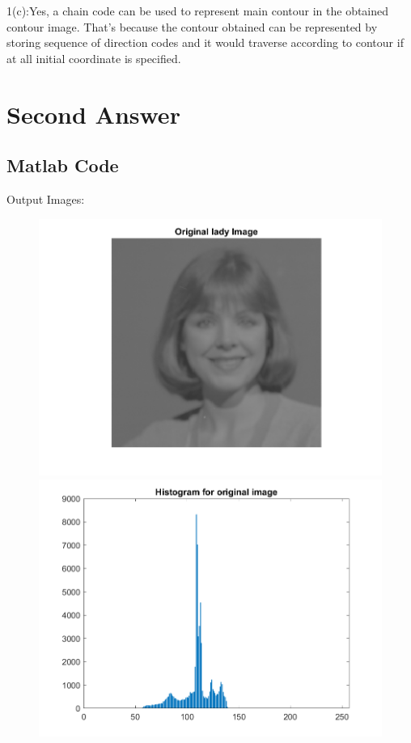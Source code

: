 \documentclass[11pt]{article} %
\begin{document}
1(c):Yes, a chain code can be used to represent main contour in the obtained contour image. That’s
because the contour obtained can be represented by storing sequence of direction codes and it would
traverse according to contour if at all initial coordinate is specified.
\clearpage 

\section {Second Answer}
\subsection*{Matlab Code}

Output Images: 
\begin{figure}
 \centering
	\includegraphics{Original_Lady.png}
	\includegraphics{Original_Hist.png}
\end{figure}
\end{document}
